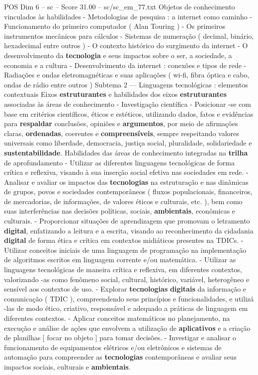 \begin{textsample}{POS Dim 6 – sc – Score 31.00 – sc/sc\_em\_77.txt}
Objetos de conhecimento vinculados às habilidades - Metodologias de pesquisa : a internet como caminho - Funcionamento do primeiro computador ( Alan Touring ) - Os primeiros instrumentos mecânicos para cálculos - Sistemas de numeração ( decimal, binário, hexadecimal entre outros ) - O contexto histórico do surgimento da internet - O desenvolvimento da \textbf{tecnologia} e seus impactos sobre o ser, a sociedade, a economia e a cultura - Desenvolvimento da internet : conexões e tipos de rede - Radiações e ondas eletromagnéticas e suas aplicações ( wi-fi, fibra óptica e cabo, ondas de rádio entre outros ) Subtema 2 — Linguagens tecnológicas : elementos contextuais Eixos \textbf{estruturantes} e habilidades dos eixos \textbf{estruturantes} associadas às áreas de conhecimento - Investigação científica - Posicionar -se com base em critérios científicos, éticos e estéticos, utilizando dados, fatos e evidências para \textbf{respaldar} conclusões, opiniões e \textbf{argumentos}, por meio de afirmações claras, \textbf{ordenadas}, coerentes e \textbf{compreensíveis}, sempre respeitando valores universais como liberdade, democracia, justiça social, pluralidade, solidariedade e \textbf{sustentabilidade}.
Habilidades das áreas de conhecimento integradas na \textbf{trilha} de aprofundamento - Utilizar as diferentes linguagens tecnológicas de forma crítica e reflexiva, visando à sua inserção social efetiva nas sociedades em rede. - Analisar e avaliar os impactos das \textbf{tecnologias} na estruturação e nas dinâmicas de grupos, povos e sociedades contemporâneos ( fluxos populacionais, financeiros, de mercadorias, de informações, de valores éticos e culturais, etc. ), bem como suas interferências nas decisões políticas, sociais, \textbf{ambientais}, econômicas e culturais. - Proporcionar situações de aprendizagem que promovam o letramento \textbf{digital}, enfatizando a leitura e a escrita, visando ao reconhecimento da cidadania \textbf{digital} de forma ética e crítica em contextos midiáticos presentes na TDICs. - Utilizar conceitos iniciais de uma linguagem de programação na implementação de algoritmos escritos em linguagem corrente e/ou matemática. - Utilizar as linguagens tecnológicas de maneira crítica e reflexiva, em diferentes contextos, valorizando -as como fenômeno social, cultural, histórico, variável, heterogêneo e sensível aos contextos de uso. - Explorar \textbf{tecnologias} \textbf{digitais} da informação e comunicação ( TDIC ), compreendendo seus princípios e funcionalidades, e utilizá -las de modo ético, criativo, responsável e adequado a práticas de linguagem em diferentes contextos. - Aplicar conceitos matemáticos no planejamento, na execução e análise de ações que envolvem a utilização de \textbf{aplicativos} e a criação de planilhas [ focar no objeto ] para tomar decisões. - Investigar e analisar o funcionamento de equipamentos elétricos e/ou eletrônicos e sistemas de automação para compreender as \textbf{tecnologias} contemporâneas e avaliar seus impactos sociais, culturais e \textbf{ambientais}.

\end{textsample}
